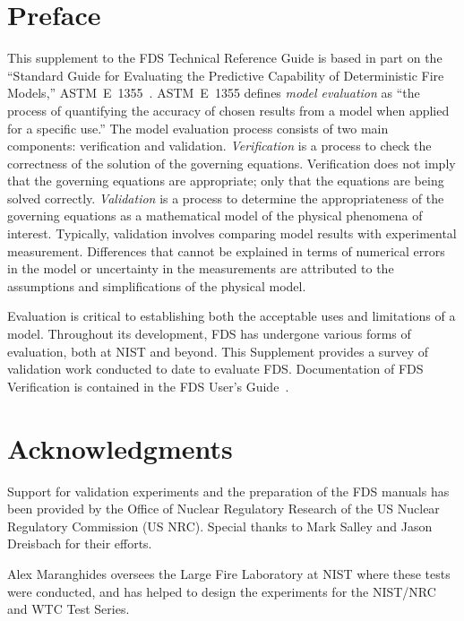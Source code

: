 \documentclass[11pt]{book}
\begin{document}
\frontmatter

\pagestyle{plain}


\chapter{Preface}


This supplement to the FDS Technical Reference Guide is based in part on the ``Standard Guide for
Evaluating the Predictive Capability of Deterministic Fire Models,'' ASTM~E~1355~\cite{ASTM:E1355}.
ASTM~E~1355 defines {\em model evaluation} as ``the process of quantifying
the accuracy of chosen results from a model when applied for a specific use.''
The model evaluation process consists of two main components: verification and validation.
{\em Verification} is a process to check the correctness of the solution of the
governing equations. Verification does not imply that the governing equations are
appropriate; only that the equations are being solved correctly.
{\em Validation} is a process to determine the appropriateness of the governing equations as a mathematical
model of the physical phenomena of interest. Typically, validation involves comparing
model results with experimental measurement. Differences that cannot be explained in terms of
numerical errors in the model or uncertainty in the measurements
are attributed to the assumptions and simplifications of the physical model.

Evaluation is critical to establishing both the acceptable uses
and limitations of a model. Throughout its development, FDS has undergone various forms of evaluation,
both at NIST and beyond. This Supplement provides a survey of validation work conducted to date to evaluate FDS.
Documentation of FDS Verification is contained in the FDS User's Guide~\cite{FDS_Users_Guide_5}.


\chapter{Acknowledgments}

\label{acksection}

Support for validation experiments and the preparation of the FDS
manuals has been provided by the Office of Nuclear Regulatory Research
of the US Nuclear Regulatory Commission (US NRC). Special thanks to
Mark Salley and Jason Dreisbach for their efforts.

Alex Maranghides oversees the Large Fire Laboratory at NIST where
these tests were conducted, and has helped to design the
experiments for the NIST/NRC and WTC  Test Series.
\end{document}
